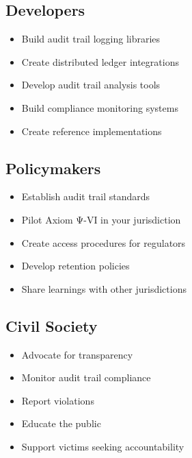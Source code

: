 \subsection{Developers}

\begin{itemize}
    \item Build audit trail logging libraries
    \item Create distributed ledger integrations
    \item Develop audit trail analysis tools
    \item Build compliance monitoring systems
    \item Create reference implementations
\end{itemize}

\subsection{Policymakers}

\begin{itemize}
    \item Establish audit trail standards
    \item Pilot Axiom Ψ-VI in your jurisdiction
    \item Create access procedures for regulators
    \item Develop retention policies
    \item Share learnings with other jurisdictions
\end{itemize}

\subsection{Civil Society}

\begin{itemize}
    \item Advocate for transparency
    \item Monitor audit trail compliance
    \item Report violations
    \item Educate the public
    \item Support victims seeking accountability
\end{itemize}

\cleardoublepage
